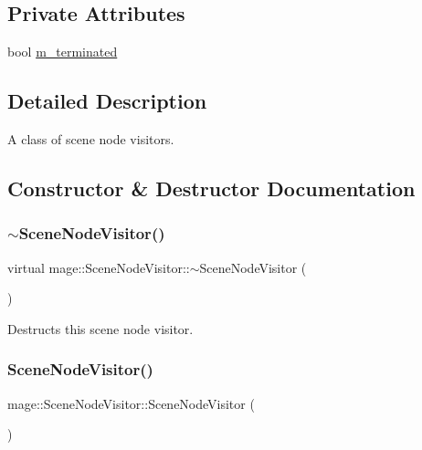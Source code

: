\subsection*{Private Attributes}
\begin{DoxyCompactItemize}
\item 
bool \hyperlink{classmage_1_1_scene_node_visitor_a3f3b8db683cdb5b9c09c1426738ee73a}{m\+\_\+terminated}
\end{DoxyCompactItemize}


\subsection{Detailed Description}
A class of scene node visitors. 

\subsection{Constructor \& Destructor Documentation}
\hypertarget{classmage_1_1_scene_node_visitor_ac45f02e28abeeb9220b0be954ca6a513}{}\label{classmage_1_1_scene_node_visitor_ac45f02e28abeeb9220b0be954ca6a513} 
\subsubsection{\texorpdfstring{$\sim$\+Scene\+Node\+Visitor()}{~SceneNodeVisitor()}}
{\footnotesize\ttfamily virtual mage\+::\+Scene\+Node\+Visitor\+::$\sim$\+Scene\+Node\+Visitor (\begin{DoxyParamCaption}{ }\end{DoxyParamCaption})\hspace{0.3cm}{\ttfamily [virtual]}}

Destructs this scene node visitor. \hypertarget{classmage_1_1_scene_node_visitor_a6a259a0ce19107bb644482b86c4bd27a}{}\label{classmage_1_1_scene_node_visitor_a6a259a0ce19107bb644482b86c4bd27a} 
\subsubsection{\texorpdfstring{Scene\+Node\+Visitor()}{SceneNodeVisitor()}\hspace{0.1cm}{\footnotesize\ttfamily [1/2]}}
{\footnotesize\ttfamily mage\+::\+Scene\+Node\+Visitor\+::\+Scene\+Node\+Visitor (\begin{DoxyParamCaption}{ }\end{DoxyParamCaption})\hspace{0.3cm}{\ttfamily [protected]}}

